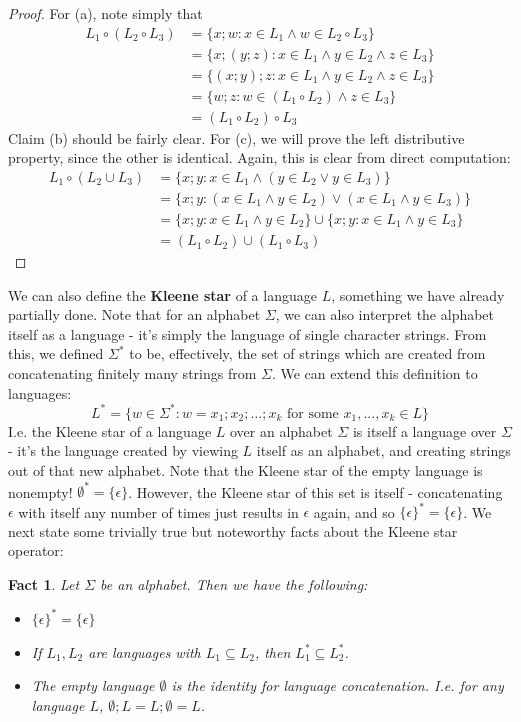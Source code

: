 \documentclass{article}
\theoremstyle{definition}
\theoremstyle{plain}
\theoremstyle{theorem}
\newtheorem{fact}{Fact}[section]
\begin{document}
\begin{proof}
	For (a), note simply that 
		\begin{align}
		 L_1 \circ (L_2 \circ L_3) &= \{x;w: x \in L_1 \wedge w \in L_2 \circ L_3 \} \\
		 		&= \{ x;(y;z): x \in L_1 \wedge y \in L_2 \wedge z \in L_3 \} \\
		 		&= \{ (x;y);z: x \in L_1 \wedge y \in L_2 \wedge z \in L_3 \} \\
		 		&= \{ w;z: w \in (L_1 \circ L_2) \wedge z \in L_3 \} \\
		 		&= (L_1 \circ L_2) \circ L_3
		\end{align}
	Claim (b) should be fairly clear. For (c), we will prove the left distributive property, since the other is identical. Again, this is clear from direct computation:
	\begin{align}
		L_1 \circ (L_2 \cup L_3) &= \{x;y: x \in L_1 \wedge (y \in L_2 \vee y \in L_3)\} \\
		&= \{x;y: (x \in L_1 \wedge y \in L_2) \vee (x \in L_1 \wedge y \in L_3) \} \\
		&= \{x;y: x \in L_1 \wedge y \in L_2\} \cup \{x;y: x \in L_1 \wedge y \in L_3\} \\
		&= (L_1 \circ L_2) \cup (L_1 \circ L_3)	
	\end{align}
\end{proof}
We can also define the \textbf{Kleene star} of a language $L$, something we have already partially done. Note that for an alphabet $\Sigma$, we can also interpret the alphabet itself as a language - it's simply the language of single character strings. From this, we defined $\Sigma^*$ to be, effectively, the set of strings which are created from concatenating finitely many strings from $\Sigma$. We can extend this definition to languages:
 \[ L^* = \{w \in \Sigma^*: w = x_1;x_2;\ldots ;x_k \textrm{ for some }x_1,...,x_k \in L\} \]
I.e. the Kleene star of a language $L$ over an alphabet $\Sigma$ is itself a language over $\Sigma$ - it's the language created by viewing $L$ itself as an alphabet, and creating strings out of that new alphabet. Note that the Kleene star of the empty language is nonempty! $\emptyset^* = \{\epsilon\}$. However, the Kleene star of this set is itself - concatenating $\epsilon$ with itself any number of times just results in $\epsilon$ again, and so $\{\epsilon\}^* = \{\epsilon\}$. We next state some trivially true but noteworthy facts about the Kleene star operator:
\begin{fact}
	Let $\Sigma$ be an alphabet. Then we have the following:
	\begin{itemize}
		\item[(a)] $\{\epsilon\}^* = \{\epsilon\}$
		\item[(b)] If $L_1, L_2$ are languages with $L_1 \subseteq L_2$, then $L_1^* \subseteq L_2^*$. 
		\item[(c)] The empty \textit{language} $\emptyset$ is the identity for language concatenation. I.e. for any language $L$, $\emptyset;L = L;\emptyset = L$. 
	\end{itemize}
\end{fact}
\end{document}
